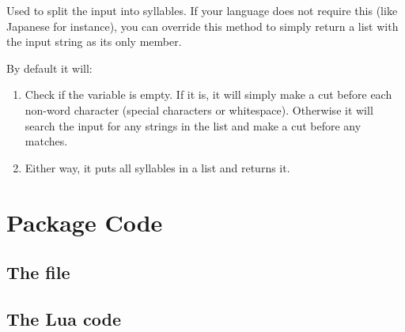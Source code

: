 \documentclass{ltxdockit}
\begin{document}
Used to split the input into syllables. If your language does not require this
(like Japanese for instance), you can override this method to simply return a
list with the input string as its only member.

By default it will:

\begin{enumerate}
  \item Check if the  variable is empty. If
    it is, it will simply make a cut before each non-word character (special
    characters or whitespace). Otherwise it will search the input for any
    strings in the list and make a cut before any matches.
  \item Either way, it puts all syllables in a list and returns it.
\end{enumerate}

\section{Package Code}

\subsection{The  file}

\subsection{The Lua code}




\end{document}
